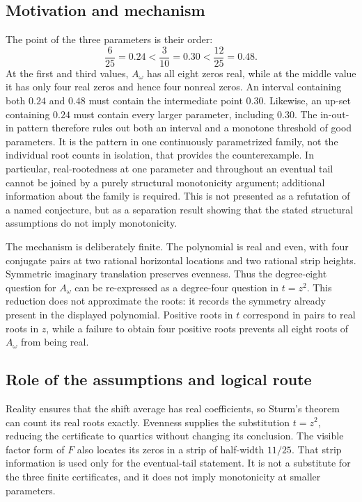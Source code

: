 \documentclass[11pt]{article}
\begin{document}
\subsection*{Motivation and mechanism}

The point of the three parameters is their order:
\[
  \frac6{25}=0.24<\frac3{10}=0.30<\frac{12}{25}=0.48.
\]
At the first and third values, $A_\omega$ has all eight zeros real, while
at the middle value it has only four real zeros and hence four nonreal zeros.
An interval containing both $0.24$ and $0.48$ must contain the intermediate
point $0.30$. Likewise, an up-set containing $0.24$ must contain every larger
parameter, including $0.30$. The in-out-in pattern therefore rules out both
an interval and a monotone threshold of good parameters. It is the pattern in
one continuously parametrized family, not the individual root counts in
isolation, that provides the counterexample. In particular, real-rootedness
at one parameter and throughout an eventual tail cannot be joined by a purely
structural monotonicity argument; additional information about the family is
required. This is not presented as a refutation of a named conjecture, but as
a separation result showing that the stated structural assumptions do not
imply monotonicity.

The mechanism is deliberately finite. The polynomial is real and even, with
four conjugate pairs at two rational horizontal locations and two rational
strip heights. Symmetric imaginary translation preserves evenness. Thus the
degree-eight question for $A_\omega$ can be re-expressed as a degree-four
question in $t=z^2$. This reduction does not approximate the roots: it records
the symmetry already present in the displayed polynomial. Positive roots in
$t$ correspond in pairs to real roots in $z$, while a failure to obtain four
positive roots prevents all eight roots of $A_\omega$ from being real.

\subsection*{Role of the assumptions and logical route}

Reality ensures that the shift average has real coefficients, so Sturm's
theorem can count its real roots exactly. Evenness supplies the substitution
$t=z^2$, reducing the certificate to quartics without changing its conclusion.
The visible factor form of $F$ also locates its zeros in a strip of half-width
$11/25$. That strip information is used only for the eventual-tail statement.
It is not a substitute for the three finite certificates, and it does not
imply monotonicity at smaller parameters.
\end{document}
